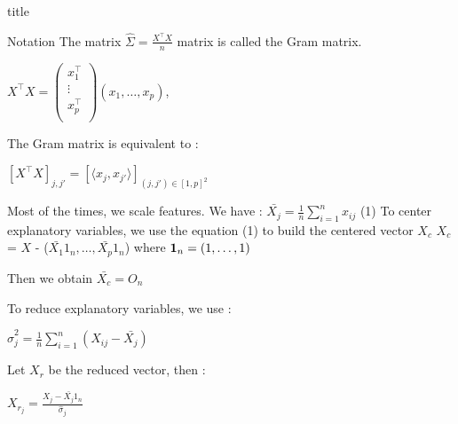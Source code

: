 \documentclass[unknownkeysallowed]{beamer}
\begin{document}
\begin{frame}{title}
\begin{block}{Notation}
The matrix $\hat\Sigma=\frac{X^{\top}X}{n}$ matrix is called the Gram matrix.
\begin{center}
    $X^{\top}X=\begin{pmatrix}
   x_{1}^{\top}  \\
   \vdots   \\
   x_{p}^{\top}  \\
\end{pmatrix}(x_{1},\dots, x_{p}) $,
\end{center}
\end{block}

The Gram matrix is equivalent to :
\begin{center}
$[X^{\top}X]_{j,j'}=[\langle x_{j},x_{j'}\rangle]_{(j,j')\in[1,p]^2}$
\end{center}

\rem
Most of the times, we scale features.
\newline
We have : $\bar{X_{j}}=\frac{1}{n} \sum\limits_{i=1}^{n} x_{ij}$ (1)
\newline
 To center explanatory variables, we use the equation (1) to build the centered vector $X_{c}$
\newline
$X_{c}$ =  $X$ - ($\bar{X_{1}}1_n,\dots,\bar{X_{p}}1_n$) where $\mathbf 1_n=(1,\dots,1)$

Then we obtain $\bar{X_{c}}=O_n$

To reduce explanatory variables, we use :
\newline
\begin{center}
$\hat\sigma_{j}^2=\frac{1}{n} \sum\limits_{i=1}^{n} (X_{ij}-\bar{X_{j}})$
\end{center}
Let $X_r$ be the reduced vector, then :
\newline
\begin{center}
$X_{r_{j}}=\frac{X_{j}-\bar{X_{j}}1_n}{\hat\sigma_{j}}$
\end{center}

\end{frame}
\end{document}
